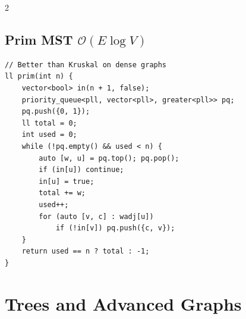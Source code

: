 \documentclass[10pt]{article}
\newcommand{\sub}[2]{\subsection[#1]{#1\hspace{0.6em}%
  \textnormal{\color{accent2}\small$\mathcal{O}(#2)$}}}
\begin{document}
\begin{multicols}{2}
\sub{Prim MST}{E \log V}
\begin{lstlisting}
// Better than Kruskal on dense graphs
ll prim(int n) {
    vector<bool> in(n + 1, false);
    priority_queue<pll, vector<pll>, greater<pll>> pq;
    pq.push({0, 1});
    ll total = 0;
    int used = 0;
    while (!pq.empty() && used < n) {
        auto [w, u] = pq.top(); pq.pop();
        if (in[u]) continue;
        in[u] = true;
        total += w;
        used++;
        for (auto [v, c] : wadj[u])
            if (!in[v]) pq.push({c, v});
    }
    return used == n ? total : -1;
}
\end{lstlisting}

\end{multicols}

\section{Trees and Advanced Graphs}
\end{document}

